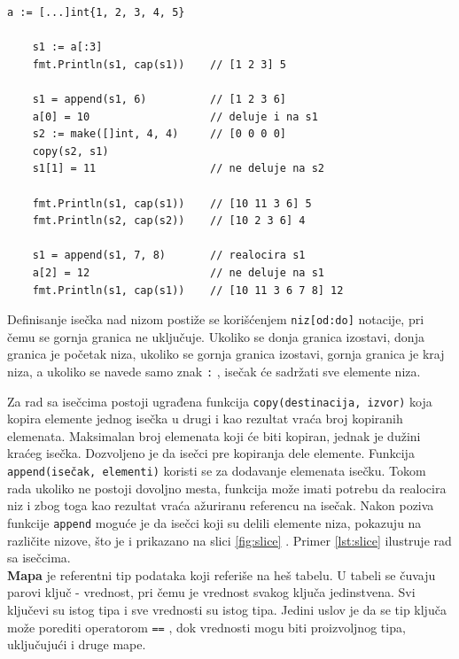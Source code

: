 \documentclass[12pt,oneside]{memoir}
\begin{document}
\begin{center}
\begin{lstlisting}[caption=Rad sa isečcima, label={lst:slice},  backgroundcolor=\color{background}]
	a := [...]int{1, 2, 3, 4, 5}
	
	s1 := a[:3] 				
	fmt.Println(s1, cap(s1))	// [1 2 3] 5
	
	s1 = append(s1, 6) 			// [1 2 3 6]
	a[0] = 10					// deluje i na s1
	s2 := make([]int, 4, 4)		// [0 0 0 0] 
	copy(s2, s1)
	s1[1] = 11					// ne deluje na s2
	
	fmt.Println(s1, cap(s1)) 	// [10 11 3 6] 5
	fmt.Println(s2, cap(s2)) 	// [10 2 3 6] 4
	
	s1 = append(s1, 7, 8)		// realocira s1
	a[2] = 12					// ne deluje na s1
	fmt.Println(s1, cap(s1))	// [10 11 3 6 7 8] 12
\end{lstlisting}
\end{center}

Definisanje isečka nad nizom postiže se korišćenjem \texttt{niz[od:do]} notacije, pri čemu se gornja granica ne uključuje. Ukoliko se donja granica izostavi, donja granica je početak niza, ukoliko se gornja granica izostavi, gornja granica je kraj niza, a ukoliko se navede samo znak \texttt{:} , isečak će sadržati sve elemente niza. 

Za rad sa isečcima postoji ugrađena funkcija \texttt{copy(destinacija, izvor)} koja kopira elemente jednog isečka u drugi i kao rezultat vraća broj kopiranih elemenata. Maksimalan broj elemenata koji će biti kopiran, jednak je dužini kraćeg isečka. Dozvoljeno je da isečci pre kopiranja dele elemente. Funkcija \texttt{append(isečak, elementi)} koristi se za dodavanje elemenata isečku. Tokom rada ukoliko ne postoji dovoljno mesta, funkcija može imati potrebu da realocira niz i zbog toga kao rezultat vraća ažuriranu referencu na isečak. Nakon poziva funkcije \texttt{append} moguće je da isečci koji su delili elemente niza, pokazuju na različite nizove, što je i prikazano na slici \ref{fig:slice} \cite{bookGoProg}. Primer \ref{lst:slice} ilustruje rad sa isečcima.
\\

\textbf{Mapa} je referentni tip podataka koji referiše na heš tabelu. U tabeli se čuvaju parovi ključ - vrednost, pri čemu je vrednost svakog ključa jedinstvena. Svi ključevi su istog tipa i sve vrednosti su istog tipa. Jedini uslov je da se tip ključa može porediti operatorom \texttt{==} , dok vrednosti mogu biti proizvoljnog tipa, uključujući i druge mape. 
\end{document}
